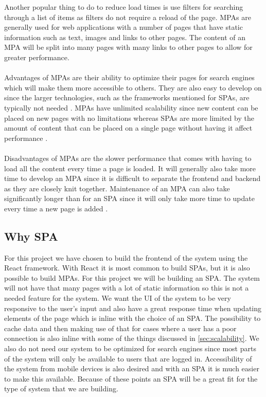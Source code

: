 Another popular thing to do to reduce load times is use filters for searching through a list of items as filters do not require a reload of the page.
MPAs are generally used for web applications with a number of pages that have static information such as text, images and links to other pages.
The content of an MPA will be split into many pages with many links to other pages to allow for greater performance.
\\\\
Advantages of MPAs are their ability to optimize their pages for search engines which will make them more accessible to others. 
They are also easy to develop on since the larger technologies, such as the frameworks mentioned for SPAs, are typically not needed \cite{SPAvsMPAMerehead}.
MPAs have unlimited scalability since new content can be placed on new pages with no limitations whereas SPAs are more limited by the amount of content that can be placed on a single page without having it affect performance \cite{SPAvsMPARuby}.
\\\\
Disadvantages of MPAs are the slower performance that comes with having to load all the content every time a page is loaded.
It will generally also take more time to develop an MPA since it is difficult to separate the frontend and backend as they are closely knit together.
Maintenance of an MPA can also take significantly longer than for an SPA since it will only take more time to update every time a new page is added \cite{SPAvsMPARuby}. 

\subsection{Why SPA}
For this project we have chosen to build the frontend of the system using the React framework. 
With React it is most common to build SPAs, but it is also possible to build MPAs. 
For this project we will be building an SPA.
The system will not have that many pages with a lot of static information so this is not a needed feature for the system.
We want the UI of the system to be very responsive to the user's input and also have a great response time when updating elements of the page which is inline with the choice of an SPA.
The possibility to cache data and then making use of that for cases where a user has a poor connection is also inline with some of the things discussed in \autoref{sec:scalability}.
We also do not need our system to be optimized for search engines since most parts of the system will only be available to users that are logged in.
Accessibility of the system from mobile devices is also desired and with an SPA it is much easier to make this available. 
Because of these points an SPA will be a great fit for the type of system that we are building.
